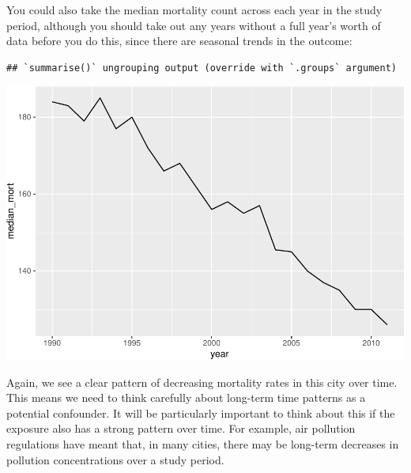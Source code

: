 \documentclass[
]{book}
\newenvironment{Shaded}{\begin{snugshade}}{\end{snugshade}}
\newcommand{\CommentTok}[1]{\textcolor[rgb]{0.56,0.35,0.01}{\textit{#1}}}
\newcommand{\DataTypeTok}[1]{\textcolor[rgb]{0.13,0.29,0.53}{#1}}
\newcommand{\DecValTok}[1]{\textcolor[rgb]{0.00,0.00,0.81}{#1}}
\newcommand{\KeywordTok}[1]{\textcolor[rgb]{0.13,0.29,0.53}{\textbf{#1}}}
\newcommand{\NormalTok}[1]{#1}
\newcommand{\OperatorTok}[1]{\textcolor[rgb]{0.81,0.36,0.00}{\textbf{#1}}}
\newcommand{\StringTok}[1]{\textcolor[rgb]{0.31,0.60,0.02}{#1}}
\begin{document}
You could also take the median mortality count across each year in the
study period, although you should take out any years without a full year's
worth of data before you do this, since there are seasonal trends in the
outcome:

\begin{Shaded}
\end{Shaded}

\begin{verbatim}
## `summarise()` ungrouping output (override with `.groups` argument)
\end{verbatim}

\includegraphics{adv_epi_analysis_files/figure-latex/unnamed-chunk-16-1.pdf}

Again, we see a clear pattern of decreasing mortality rates in this city over time.
This means we need to think carefully about long-term time patterns as a potential
confounder. It will be particularly important to think about this if the exposure
also has a strong pattern over time. For example, air pollution regulations have
meant that, in many cities, there may be long-term decreases in pollution
concentrations over a study period.
\end{document}
